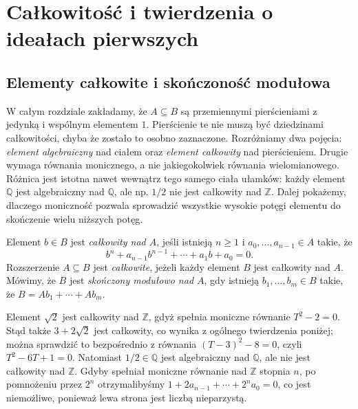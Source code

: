 \chapter{Całkowitość i twierdzenia o ideałach pierwszych}
\label{aa:ch:integral-extensions}

\providecommand{\atlasref}[2]{#2}

\section{Elementy całkowite i skończoność modułowa}
W całym rozdziale zakładamy, że $A\subseteq B$ są
przemiennymi pierścieniami z jedynką i wspólnym elementem $1$.
Pierścienie te nie muszą być dziedzinami całkowitości, chyba że
zostało to osobno zaznaczone. Rozróżniamy dwa pojęcia:
\emph{element algebraiczny} nad ciałem oraz \emph{element całkowity}
nad pierścieniem. Drugie wymaga równania monicznego, a nie
jakiegokolwiek równania wielomianowego. Różnica jest istotna
nawet wewnątrz tego samego ciała ułamków: każdy element
$\mathbb Q$ jest algebraiczny nad $\mathbb Q$, ale
np. $1/2$ nie jest całkowity nad $\mathbb Z$.
Dalej pokażemy, dlaczego moniczność pozwala sprowadzić
wszystkie wysokie potęgi elementu do skończenie wielu
niższych potęg.

\begin{definicja}[Całkowitość]\label{aa:def:integral-element}
Element $b\in B$ jest \emph{całkowity nad $A$}, jeśli istnieją
$n\ge1$ i $a_0,\ldots,a_{n-1}\in A$ takie, że
\[b^n+a_{n-1}b^{n-1}+\cdots+a_1b+a_0=0.\]
Rozszerzenie $A\subseteq B$ jest \emph{całkowite}, jeżeli każdy
element $B$ jest całkowity nad $A$. Mówimy, że $B$ jest
\emph{skończony modułowo nad $A$}, gdy istnieją
$b_1,\ldots,b_m\in B$ takie, że
$B=Ab_1+\cdots+Ab_m$.
\end{definicja}

\begin{przyklad}\label{aa:prz:integral-sqrt}
Element $\sqrt2$ jest całkowity nad $\mathbb Z$, gdyż spełnia
moniczne równanie $T^2-2=0$. Stąd także
$3+2\sqrt2$ jest całkowity, co wynika z ogólnego twierdzenia
poniżej; można sprawdzić to bezpośrednio z równania
$(T-3)^2-8=0$, czyli $T^2-6T+1=0$.
Natomiast $1/2\in\mathbb Q$ jest algebraiczny nad
$\mathbb Q$, ale nie jest całkowity nad $\mathbb Z$.
Gdyby spełniał moniczne równanie nad $\mathbb Z$ stopnia $n$,
po pomnożeniu przez $2^n$ otrzymalibyśmy
$1+2a_{n-1}+\cdots+2^na_0=0$, co jest niemożliwe,
ponieważ lewa strona jest liczbą nieparzystą.
\end{przyklad}

